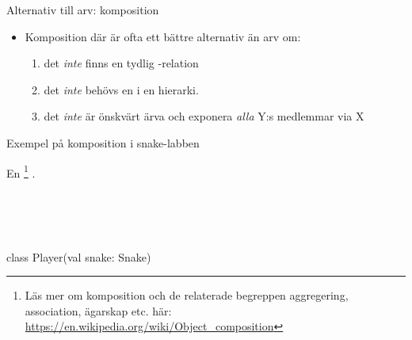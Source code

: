 \begin{Slide}{Alternativ till arv: komposition}
\begin{multicols}{2}
\end{multicols}
\begin{itemize}
\item Komposition där  är ofta ett bättre alternativ än arv om: 
\begin{enumerate} \SlideFontTiny
\item det \emph{inte} finns en tydlig -relation 
\item det \emph{inte} behövs en  i en hierarki.
\item det \emph{inte} är önskvärt ärva och exponera \emph{alla} Y:s medlemmar via X
\end{enumerate}
\end{itemize}
\end{Slide}

\begin{Slide}{Exempel på komposition i snake-labben}

\begin{multicols}{2}


En   \footnote{Läs mer om komposition och de relaterade begreppen aggregering, association, ägarskap etc. här:\\\url{https://en.wikipedia.org/wiki/Object_composition}}
 .\\~\\

\newcommand{\TextBox}[1]{\raisebox{0pt}[1em][0.5em]{#1}}

\columnbreak

~\\~\\

\begin{Code}
class Player(val snake: Snake)
\end{Code} 

\end{multicols}

\end{Slide}

